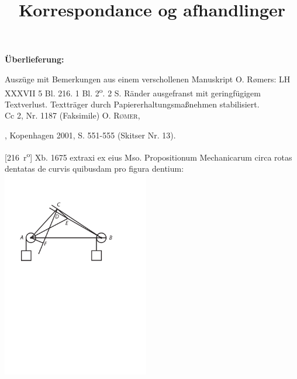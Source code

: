 \begin{ledgroupsized}[r]{120mm}
\footnotesize 
\pstart 
\noindent\textbf{\"{U}berlieferung:}
\pend
\end{ledgroupsized} 
\begin{ledgroupsized}[r]{114mm}
\footnotesize 
\pstart \parindent -6mm
Auszüge mit Bemerkungen aus einem verschollenen Manuskript O. R{\o}mers: LH XXXVII 5 Bl. 216. 1 Bl. 2\textsuperscript{o}. 2 S.
R\"{a}nder ausgefranst mit geringf\"{u}gigem Textverlust.
Textträger durch Papiererhaltungsmaßnehmen stabilisiert.\\%
Cc 2, Nr. 1187
\pend 
\footnotesize 
\pstart
\parindent -6mm
(Faksimile) \cite{01047}\textsc{O. R{\o}mer}, \title{Korrespondance og afhandlinger}, Kopenhagen 2001, S. 551-555 (Skitser Nr. 13).
\pend
\end{ledgroupsized}
%
%
\vspace{8mm}
\pstart%
\normalsize%
\noindent%
[216~r\textsuperscript{o}] 
Xb. 1675 extraxi ex eius Mso.
\pend
\count{}
\count{}
\count{}
\pstart%
\noindent%
Propositionum \protect{} Mechanicarum circa rotas dentatas\protect{}  de curvis quibusdam pro figura dentium:
\pend
\vspace{1em}%
\pstart
\centering
\noindent
\includegraphics[width=0.48\textwidth]{images/LH03705_216r-d1.pdf}\\
